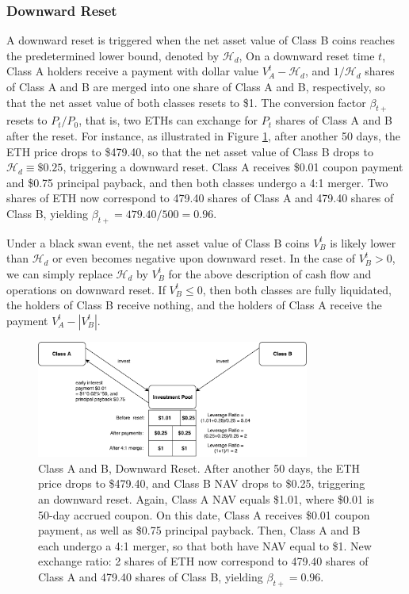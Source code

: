\documentclass[11pt]{article}%
\numberwithin{equation}{section}
\theoremstyle{plain}
\begin{document}
\subsubsection{Downward Reset}
 A downward reset is triggered when the net asset value of Class B coins reaches the predetermined lower bound, denoted by $\mathcal{H}_{d}$,  On a downward reset time $t$, Class A holders receive a payment with dollar value $V_{A}^{t}-\mathcal{H}_{d}$, and  $1/\mathcal{H}_{d}$ shares of Class A and B are merged into one share of Class A and B, respectively, so that the net asset value of both classes resets to \$1. The conversion factor $\beta_{t+}$ resets to $P_t/P_0$, that is, two ETHs can exchange for $P_t$ shares of Class A and B after the reset. For instance, as illustrated in Figure \ref{fig:downward}, after another 50 days, the ETH price drops to \$479.40, so that the net asset value of Class B drops to $\mathcal{H}_{d}\equiv \$0.25$, triggering a downward reset. Class A receives \$0.01 coupon payment and \$0.75 principal payback, and then both classes undergo a 4:1 merger. Two shares of ETH now correspond to 479.40 shares of Class A and 479.40 shares of Class B, yielding $\beta_{t+}=479.40/500=0.96$.

 Under a black swan event, the net asset value of Class B coins $V_B^t$ is likely lower than $\mathcal{H}_{d}$ or even becomes negative upon downward reset. In the case of $V_B^t>0$, we can simply replace $\mathcal{H}_{d}$ by $V_B^t$ for the above description of cash flow and operations on downward reset. If $V_B^t\leq 0$, then both classes are fully liquidated, the holders of Class B receive nothing, and the holders of Class A receive the payment $V_A^t-|V_{B}^{t}|$.

\begin{figure}[!htb]
	\centering
	\includegraphics[width=0.8\textwidth]{downward}
	\caption{Class A and B, Downward Reset. After another 50 days, the ETH price drops to \$479.40, and Class B NAV drops to \$0.25, triggering an downward reset. Again, Class A NAV equals \$1.01, where \$0.01 is 50-day accrued coupon. On this date, Class A receives \$0.01 coupon payment, as well as \$0.75 principal payback. Then, Class A and B each undergo a 4:1 merger, so that both have NAV equal to \$1. New exchange ratio: 2 shares of ETH now correspond to 479.40 shares of Class A and 479.40 shares of Class B, yielding $\beta_{t+}=0.96$.}\label{fig:downward}
\end{figure}
\end{document}
